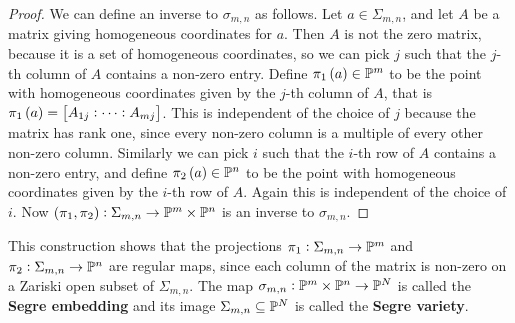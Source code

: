\begin{proof}
We can define an inverse to $ \sigma_{m, n} $ as follows. Let $ a \in \Sigma_{m, n} $, and let $ A $ be a matrix giving homogeneous coordinates for $ a $. Then $ A $ is not the zero matrix, because it is a set of homogeneous coordinates, so we can pick $ j $ such that the $ j $-th column of $ A $ contains a non-zero entry. Define $ \pi_1\br{a} \in \PP^m $ to be the point with homogeneous coordinates given by the $ j $-th column of $ A $, that is $ \pi_1\br{a} = \sbr{A_{1j} : \dots : A_{mj}} $. This is independent of the choice of $ j $ because the matrix has rank one, since every non-zero column is a multiple of every other non-zero column. Similarly we can pick $ i $ such that the $ i $-th row of $ A $ contains a non-zero entry, and define $ \pi_2\br{a} \in \PP^n $ to be the point with homogeneous coordinates given by the $ i $-th row of $ A $. Again this is independent of the choice of $ i $. Now $ \br{\pi_1, \pi_2} : \Sigma_{m, n} \to \PP^m \times \PP^n $ is an inverse to $ \sigma_{m, n} $.
\end{proof}

This construction shows that the projections $ \pi_1 : \Sigma_{m, n} \to \mathbb{P}^m $ and $ \pi_2 : \Sigma_{m, n} \to \mathbb{P}^n $ are regular maps, since each column of the matrix is non-zero on a Zariski open subset of $ \Sigma_{m, n} $. The map $ \sigma_{m, n} : \mathbb{P}^m \times \mathbb{P}^n \to \mathbb{P}^N $ is called the \textbf{Segre embedding} and its image $ \Sigma_{m, n} \subseteq \mathbb{P}^N $ is called the \textbf{Segre variety}.

